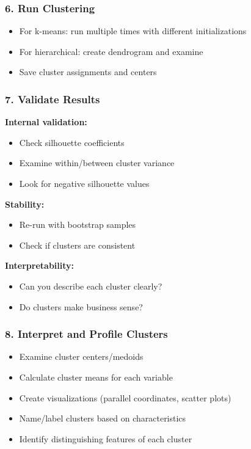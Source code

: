 \documentclass[
]{article}
\begin{document}
\subsubsection{6. Run Clustering}

\begin{itemize}
\item
  For k-means: run multiple times with different initializations
\item
  For hierarchical: create dendrogram and examine
\item
  Save cluster assignments and centers
\end{itemize}

\subsubsection{7. Validate Results}

\textbf{Internal validation:}

\begin{itemize}
\item
  Check silhouette coefficients
\item
  Examine within/between cluster variance
\item
  Look for negative silhouette values
\end{itemize}

\textbf{Stability:}

\begin{itemize}
\item
  Re-run with bootstrap samples
\item
  Check if clusters are consistent
\end{itemize}

\textbf{Interpretability:}

\begin{itemize}
\item
  Can you describe each cluster clearly?
\item
  Do clusters make business sense?
\end{itemize}

\subsubsection{8. Interpret and Profile Clusters}

\begin{itemize}
\item
  Examine cluster centers/medoids
\item
  Calculate cluster means for each variable
\item
  Create visualizations (parallel coordinates, scatter plots)
\item
  Name/label clusters based on characteristics
\item
  Identify distinguishing features of each cluster
\end{itemize}
\end{document}
